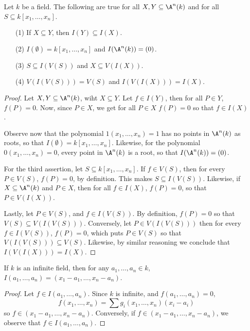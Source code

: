 \begin{proposition}\label{1.3.2}
    Let $k$ be a field. The following are true for all $X,Y \subseteq \A^n(k)$
    and for all $S \subseteq k[x_1, \dots, x_n]$.
    \begin{enumerate}
        \item[(1)] If $X \subseteq Y$, then $I(Y) \subseteq I(X)$.

        \item[(2)] $I(\emptyset)=k[x_1, \dots, x_n]$ and $I(\A^n(k))=(0)$.

        \item[(3)] $S \subseteq I(V(S))$ and $X \subseteq V(I(X))$.

        \item[(4)] $V(I(V(S)))=V(S)$ and $I(V(I(X)))=I(X)$.
    \end{enumerate}
\end{proposition}
\begin{proof}
    Let $X,Y \subseteq \A^n(k)$, wiht $X \subseteq Y$. Let $f \in I(Y)$, then
    for all $P \in Y$, $f(P)=0$. Now, since $P \in X$, we get for all $P \in X$
    $f(P)=0$ so that $f \in I(X)$.

    Observe now that the polynomial $1(x_1, \dots, x_n)=1$ has no points in
    $\A^n(k)$ as roots, so that $I(\emptyset)=k[x_1, \dots, x_n]$. Likewise, for
    the polynomial $0(x_1, \dots, x_n)=0$, every point in $\A^n(k)$ is a root,
    so that $I(\A^n(k))=(0)$.

    For the third assertion, let $S \subseteq k[x_1, \dots, x_n]$. If $f \in V(S)$,
    then for every  $P \in V(S)$, $f(P)=0$, by definition. This makes $S
    \subseteq I(V(S))$. Likewise, if $X \subseteq \A^n(k)$ and $P \in X$, then
    for all $f \in I(X)$, $f(P)=0$, so that $P \in V(I(X))$.

    Lastly, let $P \in V(S)$, and $f \in I(V(S))$. By definition, $f(P)=0$ so
    that $V(S) \subseteq V(I(V(S)))$. Conversely, let $P \in V(I(V(S)))$ then
    for every $f \in I(V(S))$, $f(P)=0$, which puts $P \in V(S)$ so that
    $V(I(V(S))) \subseteq V(S)$. Likewise, by similar reasoning we conclude that
    $I(V(I(X)))=I(X)$.
\end{proof}
\begin{corollary}
    If $k$ is an infinite field, then for any  $a_1, \dots, a_n \in k$, $I(a_1,
    \dots, a_n)=(x_1-a_1, \dots, x_n-a_n)$.
\end{corollary}
\begin{proof}
    Let $f \in I(a_1, \dots, a_n)$. Since $k$ is infinite, and  $f(a_1, \dots,
    a_n)=0$,
    \begin{equation*}
        f(x_1, \dots, x_n)=\sum{g_i(x_1, \dots, x_n)(x_i-a_i)}
    \end{equation*}
    so $f \in (x_1-a_1, \dots, x_n-a_n)$. Conversely, if $f \in (x_1-a_1, \dots,
    x_n-a_n)$, we observe that $f \in I(a_1, \dots, a_n)$.
\end{proof}

